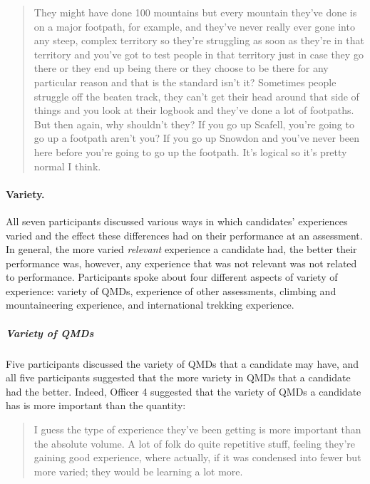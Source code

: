 \documentclass[
  12pt,
  a4paper,
]{book}
\begin{document}
\begin{quote}
They might have done 100 mountains but every mountain they've done is on a major footpath, for example, and they've never really ever gone into any steep, complex territory so they're struggling as soon as they're in that territory and you've got to test people in that territory just in case they go there or they end up being there or they choose to be there for any particular reason and that is the standard isn't it? Sometimes people struggle off the beaten track, they can't get their head around that side of things and you look at their logbook and they've done a lot of footpaths. But then again, why shouldn't they? If you go up Scafell, you're going to go up a footpath aren't you? If you go up Snowdon and you've never been here before you're going to go up the footpath. It's logical so it's pretty normal I think.
\end{quote}

\hypertarget{variety.}{%
\paragraph{Variety.}\label{variety.}}

All seven participants discussed various ways in which candidates' experiences varied and the effect these differences had on their performance at an assessment. In general, the more varied \emph{relevant} experience a candidate had, the better their performance was, however, any experience that was not relevant was not related to performance. Participants spoke about four different aspects of variety of experience: variety of QMDs, experience of other assessments, climbing and mountaineering experience, and international trekking experience.

\hypertarget{variety-of-qmds}{%
\subparagraph{Variety of QMDs}\label{variety-of-qmds}}

Five participants discussed the variety of QMDs that a candidate may have, and all five participants suggested that the more variety in QMDs that a candidate had the better. Indeed, Officer 4 suggested that the variety of QMDs a candidate has is more important than the quantity:

\begin{quote}
I guess the type of experience they've been getting is more important than the absolute volume. A lot of folk do quite repetitive stuff, feeling they're gaining good experience, where actually, if it was condensed into fewer but more varied; they would be learning a lot more.
\end{quote}
\end{document}
